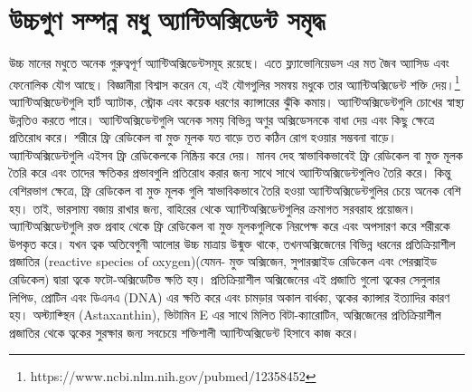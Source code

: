 \documentclass[a4paper,12pt]{article}
\begin{document}
\section{উচ্চগুণ সম্পন্ন মধু অ্যান্টিঅক্সিডেন্ট সমৃদ্ধ}
উচ্চ মানের মধুতে অনেক গুরুত্বপূর্ণ অ্যান্টিঅক্সিডেন্টসমূহ রয়েছে। এতে ফ্ল্যাভোনিয়েডস এর মত জৈব অ্যাসিড এবং ফেনোলিক যৌগ আছে। বিজ্ঞানীরা বিশ্বাস করেন যে, এই যৌগগুলির সমন্বয় মধুকে তার অ্যান্টিঅক্সিডেন্ট শক্তি দেয়।\footnote{https://www.ncbi.nlm.nih.gov/pubmed/12358452}
অ্যান্টিঅক্সিডেন্টগুলি হার্ট অ্যাটাক, স্ট্রোক এবং কয়েক ধরণের ক্যান্সারের ঝুঁকি কমায়। অ্যান্টিঅক্সিডেন্টগুলি চোখের স্বাস্থ্য উন্নতিও করতে পারে। অ্যান্টিঅক্সিডেন্টগুলি অনেক সময় বিভিন্ন অণুর অক্সিডেসনকে বাধা দেয় এবং কিছু ক্ষেত্রে প্রতিরোধ করে। শরীরে ফ্রি রেডিকেল বা মুক্ত মূলক যত বাড়ে তত কঠিন রোগ হওয়ার সম্ভবনা বাড়ে।  অ্যান্টিঅক্সিডেন্টগুলি এইসব ফ্রি রেডিকেলকে নিষ্ক্রিয় করে দেয়। মানব দেহ স্বাভাবিকভাবেই  ফ্রি রেডিকেল বা মুক্ত মূলক  তৈরি করে এবং তাদের ক্ষতিকর প্রভাবগুলি প্রতিরোধ করার জন্য সাথে সাথে অ্যান্টিঅক্সিডেন্টগুলিও তৈরি করে। কিন্তু বেশিরভাগ ক্ষেত্রে, ফ্রি রেডিকেল বা মুক্ত মূলক গুলি স্বাভাবিকভাবে  তৈরি হওয়া অ্যান্টিঅক্সিডেন্টগুলির চেয়ে অনেক বেশি হয়। তাই, ভারসাম্য বজায় রাখার জন্য, বাহিরের থেকে অ্যান্টিঅক্সিডেন্টগুলির ক্রমাগত সরবরাহ প্রয়োজন। অ্যান্টিঅক্সিডেন্টগুলি রক্ত ​​প্রবাহ থেকে ফ্রি রেডিকেল বা মুক্ত মূলকগুলিকে নিরপেক্ষ করে এবং অপসারণ করে শরীরকে উপকৃত করে। যখন ত্বক অতিবেগুনী আলোর উচ্চ মাত্রায় উন্মুক্ত থাকে, তখনঅক্সিজেনের বিভিন্ন ধরনের প্রতিক্রিয়াশীল প্রজাতির ({reactive species of oxygen})(যেমন- মুক্ত অক্সিজেন, সুপারক্সাইড রেডিকেল এবং পেরক্সাইড রেডিকেল) দ্বারা ত্বকে  ফটো-অক্সিডেটিভ ক্ষতি হয়। প্রতিক্রিয়াশীল অক্সিজেনের এই প্রজাতি গুলো ত্বকের সেলুলার লিপিড, প্রোটিন এবং ডিএনএ ({DNA}) এর ক্ষতি করে এবং চামড়ার অকাল বার্ধক্য, ত্বকের ক্যান্সার ইত্যাদির কারণ হয়।
অস্ট্যাক্স্থিন ({Astaxanthin}), ভিটামিন {E} এর সাথে মিলিত বিটা-ক্যারোটিন, অক্সিজেনের প্রতিক্রিয়াশীল প্রজাতির থেকে ত্বকের সুরক্ষার জন্য সবচেয়ে শক্তিশালী অ্যান্টিঅক্সিডেন্ট হিসাবে কাজ করে।
\end{document}
